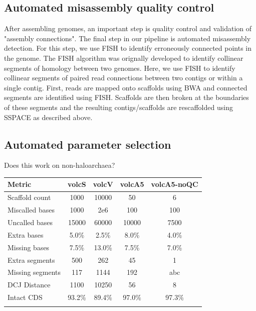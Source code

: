 \documentclass{bioinfo}
\begin{document}
\subsection{Automated misassembly quality control}

After assembling genomes, an important step is quality control and validation
of "assembly connections". The final step in our pipeline is automated 
misassembly detection. For this step, we use FISH to identify erroneously
connected points in the genome. The FISH algorithm was orignally developed
to identify collinear segments of homology between two genomes. Here, we use
FISH to identify collinear segments of paired read connections between two contigs
or within a single contig. First, reads are mapped onto scaffolds using BWA and 
connected segments are identified using 
FISH. Scaffolds are then broken at the boundaries of these segments and the 
resulting contigs/scaffolds are rescaffolded using SSPACE as described above.


\subsection{Automated parameter selection}

Does this work on non-haloarchaea?


\begin{table}[!t]
{\begin{tabular}{l|cccc}\toprule
Metric & volcS & volcV & volcA5 & volcA5-noQC\\\midrule
Scaffold count & 1000 & 10000 & 50  & 6 \\
Miscalled bases & 1000 & 2e6 & 100 & 100 \\
Uncalled bases & 15000 & 60000 & 10000 & 7500 \\
Extra bases & 5.0\% & 2.5\% & 8.0\% & 4.0\% \\
Missing bases & 7.5\% & 13.0\% & 7.5\% & 7.0\% \\
Extra segments & 500 & 262 & 45 & 1 \\
Missing segments & 117 & 1144 & 192 & abc \\
DCJ Distance & 1100 & 10250 & 56 & 8 \\
Intact CDS & 93.2\% & 89.4\% & 97.0\% & 97.3\% \\
\botrule \\
\end{tabular}}{}
\end{table}
\end{document}
